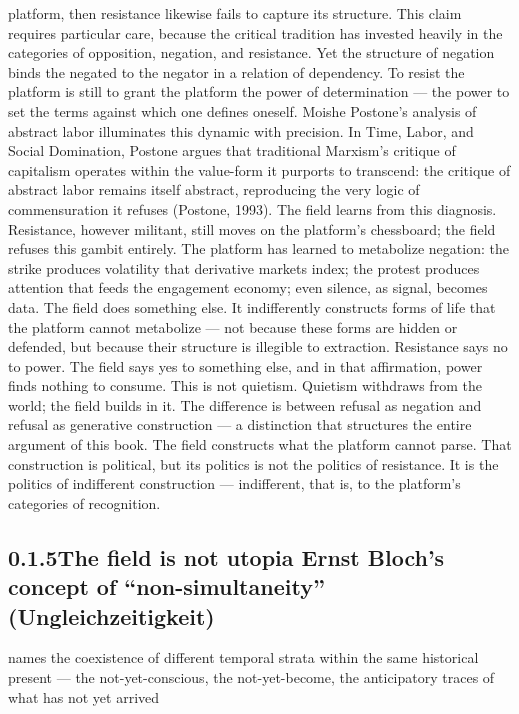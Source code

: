 platform, then resistance likewise fails to capture its structure. This claim requires particular care, because the critical tradition has invested heavily in the categories of opposition, negation, and resistance. Yet the structure of negation binds the negated to the negator in a relation of dependency. To resist the platform is still to grant the platform the power of determination — the power to set the terms against which one defines oneself. Moishe Postone’s analysis of abstract labor illuminates this dynamic with precision. In Time, Labor, and Social Domination, Postone argues that traditional Marxism’s critique of capitalism operates within the value-form it purports to transcend: the critique of abstract labor remains itself abstract, reproducing the very logic of commensuration it refuses (Postone, 1993). The field learns from this diagnosis. Resistance, however militant, still moves on the platform’s chessboard; the field refuses this gambit entirely. The platform has learned to metabolize negation: the strike produces volatility that derivative markets index; the protest produces attention that feeds the engagement economy; even silence, as signal, becomes data. The field does something else. It indifferently constructs forms of life that the platform cannot metabolize — not because these forms are hidden or defended, but because their structure is illegible to extraction. Resistance says no to power. The field says yes to something else, and in that affirmation, power finds nothing to consume. This is not quietism. Quietism withdraws from the world; the field builds in it. The difference is between refusal as negation and refusal as generative construction — a distinction that structures the entire argument of this book. The field constructs what the platform cannot parse. That construction is political, but its politics is not the politics of resistance. It is the politics of indifferent construction — indifferent, that is, to the platform’s categories of recognition.

\subsection{0.1.5\quad The field is not utopia Ernst Bloch’s concept of “non-simultaneity” (Ungleichzeitigkeit)}

names the coexistence of different temporal strata within the same historical present — the not-yet-conscious, the not-yet-become, the anticipatory traces of what has not yet arrived

